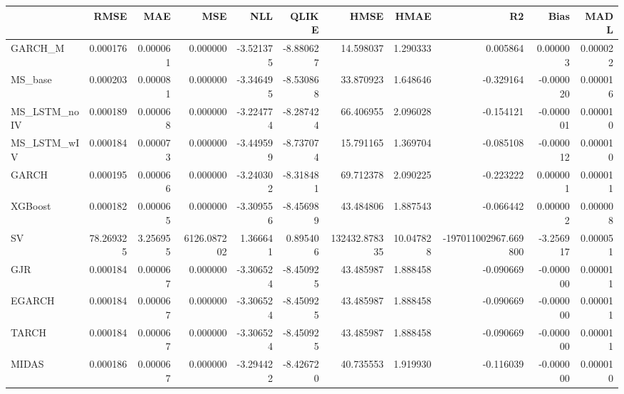 \begin{tabular}{lrrrrrrrrrr}
\toprule
 & RMSE & MAE & MSE & NLL & QLIKE & HMSE & HMAE & R2 & Bias & MADL \\
\midrule
GARCH_M & 0.000176 & 0.000061 & 0.000000 & -3.521375 & -8.880627 & 14.598037 & 1.290333 & 0.005864 & 0.000003 & 0.000022 \\
MS_base & 0.000203 & 0.000081 & 0.000000 & -3.346495 & -8.530868 & 33.870923 & 1.648646 & -0.329164 & -0.000020 & 0.000016 \\
MS_LSTM_noIV & 0.000189 & 0.000068 & 0.000000 & -3.224774 & -8.287424 & 66.406955 & 2.096028 & -0.154121 & -0.000001 & 0.000010 \\
MS_LSTM_wIV & 0.000184 & 0.000073 & 0.000000 & -3.449599 & -8.737074 & 15.791165 & 1.369704 & -0.085108 & -0.000012 & 0.000010 \\
GARCH & 0.000195 & 0.000066 & 0.000000 & -3.240302 & -8.318481 & 69.712378 & 2.090225 & -0.223222 & 0.000001 & 0.000011 \\
XGBoost & 0.000182 & 0.000065 & 0.000000 & -3.309556 & -8.456989 & 43.484806 & 1.887543 & -0.066442 & 0.000002 & 0.000008 \\
SV & 78.269325 & 3.256955 & 6126.087202 & 1.366641 & 0.895406 & 132432.878335 & 10.047828 & -197011002967.669800 & -3.256917 & 0.000051 \\
GJR & 0.000184 & 0.000067 & 0.000000 & -3.306524 & -8.450925 & 43.485987 & 1.888458 & -0.090669 & -0.000000 & 0.000011 \\
EGARCH & 0.000184 & 0.000067 & 0.000000 & -3.306524 & -8.450925 & 43.485987 & 1.888458 & -0.090669 & -0.000000 & 0.000011 \\
TARCH & 0.000184 & 0.000067 & 0.000000 & -3.306524 & -8.450925 & 43.485987 & 1.888458 & -0.090669 & -0.000000 & 0.000011 \\
MIDAS & 0.000186 & 0.000067 & 0.000000 & -3.294422 & -8.426720 & 40.735553 & 1.919930 & -0.116039 & -0.000000 & 0.000010 \\
\bottomrule
\end{tabular}

